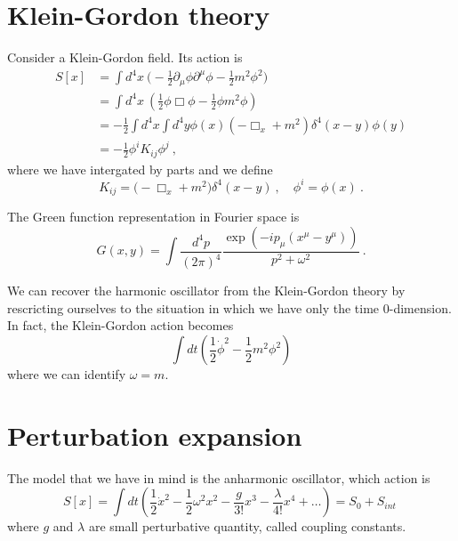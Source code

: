 \chapter{Klein-Gordon theory}

    Consider a Klein-Gordon field. Its action is 
    \begin{equation*}
    \begin{aligned}
        S[x] & = \int d^4 x ~ \Big ( - \frac{1}{2} \partial_\mu \phi \partial^\mu \phi - \frac{1}{2} m^2 \phi^2 \Big) \\ & = \int d^4 x ~ ( \frac{1}{2} \phi \Box \phi - \frac{1}{2} \phi m^2 \phi) \\ & = - \frac{1}{2} \int d^4 x \int d^4 y \phi(x) (- \Box_x + m^2) \delta^4 (x - y) \phi(y) \\ & = - \frac{1}{2} \phi^i K_{ij} \phi^j ~,
    \end{aligned}
    \end{equation*}
    where we have intergated by parts and we define 
    \begin{equation*}
        K_{ij} = \Big (- \Box_x + m^2 \Big) \delta^4 (x - y) ~, \quad \phi^i = \phi(x) ~.
    \end{equation*}

    The Green function representation in Fourier space is 
    \begin{equation*}
        G(x, y) = \int \frac{d^4p}{(2\pi)^4} \frac{\exp(- i p_\mu (x^\mu - y^\mu))}{p^2 + \omega^2} ~.
    \end{equation*} 

    We can recover the harmonic oscillator from the Klein-Gordon theory by rescricting ourselves to the situation in which we have only the time $0$-dimension. In fact, the Klein-Gordon action becomes 
    \begin{equation*}
        \int dt (\frac{1}{2} \dot \phi^2 - \frac{1}{2} m^2 \phi^2)
    \end{equation*}
    where we can identify $\omega = m$. 

\chapter{Perturbation expansion}

    The model that we have in mind is the anharmonic oscillator, which action is
    \begin{equation*}
        S[x] = \int dt (\frac{1}{2} \dot x^2 - \frac{1}{2} \omega^2 x^2 - \frac{g}{3!} x^3 - \frac{\lambda}{4!} x^4 + \ldots) = S_0 + S_{int} ~
    \end{equation*}
    where $g$ and $\lambda$ are small perturbative quantity, called coupling constants.

